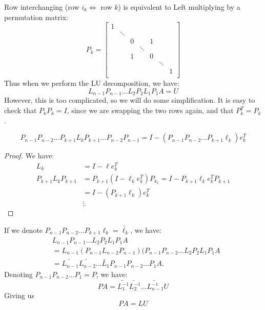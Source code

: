 \documentclass[../main/main.tex]{subfiles}
\begin{document}
    Row interchanging (row $i_{k} \iff$ row $k$) is equivalent to Left multiplying by a permutation matrix: \[
      P_{k} = \begin{bmatrix}
        1 &&&&&&\\
         &\ddots&&&&&\\
         &&0&&1&&\\
         &&&\ddots&&&\\
         &&1&&0&&\\
         &&&&&\ddots&\\
         &&&&&&1\\
      \end{bmatrix}
    \]
    Thus when we perform the LU decomposition, we have: \[
L_{n-1} P_{n-1} \ldots L_{2} P_{2} L_{1}P_{1} A = U
    \]
    However, this is too complicated, so we will do some simplification. It is easy to check that $P_{k}P_{k} = I$, since we are swapping the two rows again, and that $P^{T}_{k} = P_{k}$.
    \begin{lemma}
 \[P_{n-1}P_{n-2}\ldots P_{k+1}L_{k}P_{k+1}\ldots P_{n-2} P_{n-1} = I - (P_{n-1}P_{n-2}\ldots P_{k+1}\ell_{k})e^{T}_{k}\]
    \end{lemma}
    \begin{proof}
      We have:
      \begin{align*}
L_{k} &= I - \ell e^{T}_{k} \\
        P_{k+1}L_{k}P_{k+1} &= P_{k+1}(I-\ell _{k}e^{T}_{k})P_{k_{1}} = I - P_{k+1}\ell_{k}e^{T}_{k}P_{k+1} \\
        &= I - (P_{k+1}\ell _{k}) e^{T}_{k} \\
        & \vdots
        .\end{align*}
    \end{proof}
    If we denote $P_{n-1}P_{n-2} \ldots P_{k+1}\ell_{k} = \tilde{\ell_{k}}$, we have:
\begin{align*}
  &L_{n-1} P_{n-1} \ldots L_{2} P_{2} L_{1}P_{1} A \\
  &=L_{n-1} (P_{n-1} L_{n-2}P_{n-1})(P_{n-1}P_{n-2} \ldots L_{2} P_{2} L_{1}P_{1} A \\
  &=\tilde{L_{n-1}}\tilde{L_{n-2}}\ldots\tilde{L_{1}}P_{n-1}P_{n-2}\ldots P_{1}A
    .\end{align*}
  Denoting $P_{n-1}P_{n-2}\ldots P_{1}=P$, we have: \[
    PA = \tilde{L_{1}^{-1}}\tilde{L_{2}^{-1}}\ldots\tilde{L_{n-1}^{-1}}U
  \]
  Giving us \[
    PA = LU
  \]
\end{document}
